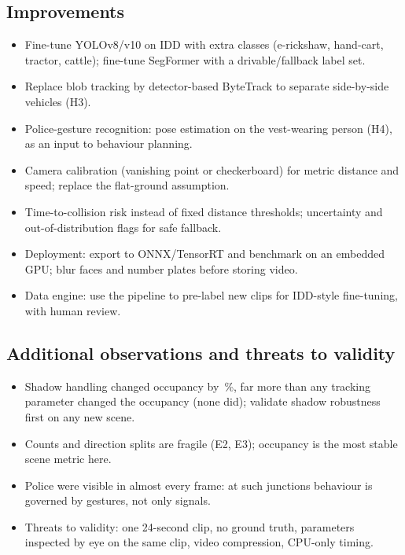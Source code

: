 \documentclass[11pt,a4paper]{article}
\newcommand{\pct}[1]{#1\,\%}
\begin{document}
\subsection{Improvements}
\begin{itemize}
\item Fine-tune YOLOv8/v10 on IDD with extra classes (e-rickshaw, hand-cart, tractor, cattle); fine-tune SegFormer with a drivable/fallback label set.
\item Replace blob tracking by detector-based ByteTrack to separate side-by-side vehicles (H3).
\item Police-gesture recognition: pose estimation on the vest-wearing person (H4), as an input to behaviour planning.
\item Camera calibration (vanishing point or checkerboard) for metric distance and speed; replace the flat-ground assumption.
\item Time-to-collision risk instead of fixed distance thresholds; uncertainty and out-of-distribution flags for safe fallback.
\item Deployment: export to ONNX/TensorRT and benchmark on an embedded GPU; blur faces and number plates before storing video.
\item Data engine: use the pipeline to pre-label new clips for IDD-style fine-tuning, with human review.
\end{itemize}

\subsection{Additional observations and threats to validity}
\begin{itemize}
\item Shadow handling changed occupancy by \pct{\mShadowGainRel}, far more than any tracking parameter changed the occupancy (none did); validate shadow robustness first on any new scene.
\item Counts and direction splits are fragile (E2, E3); occupancy is the most stable scene metric here.
\item Police were visible in almost every frame: at such junctions behaviour is governed by gestures, not only signals.
\item Threats to validity: one 24-second clip, no ground truth, parameters inspected by eye on the same clip, video compression, CPU-only timing.
\end{itemize}

\end{document}
